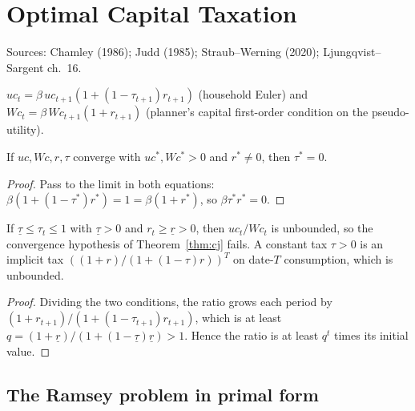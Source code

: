 \chapter{Optimal Capital Taxation}
\label{chap:fiscal}

Sources: Chamley (1986); Judd (1985); Straub--Werning (2020); Ljungqvist--Sargent ch.~16.

\begin{definition}
\label{def:cj_foc}
\leanok
$uc_t = \beta\,uc_{t+1}(1 + (1-\tau_{t+1})r_{t+1})$ (household Euler) and $Wc_t = \beta\,Wc_{t+1}(1+r_{t+1})$
(planner's capital first-order condition on the pseudo-utility).
\end{definition}

\begin{theorem}
\label{thm:cj}
\leanok
{}
If $uc, Wc, r, \tau$ converge with $uc^*, Wc^* > 0$ and $r^* \ne 0$, then $\tau^* = 0$.
\end{theorem}
\begin{proof}
\leanok
Pass to the limit in both equations: $\beta(1+(1-\tau^*)r^*) = 1 = \beta(1+r^*)$, so $\beta\tau^*r^* = 0$.
\end{proof}

\begin{theorem}
\label{thm:sw}
\leanok
{}
If $\underline\tau \le \tau_t \le 1$ with $\underline\tau>0$ and $r_t \ge \underline r > 0$, then $uc_t/Wc_t$ is
unbounded, so the convergence hypothesis of Theorem~\ref{thm:cj} fails. A constant tax $\tau>0$ is an implicit tax
$((1+r)/(1+(1-\tau)r))^T$ on date-$T$ consumption, which is unbounded.
\end{theorem}
\begin{proof}
\leanok
Dividing the two conditions, the ratio grows each period by $(1+r_{t+1})/(1+(1-\tau_{t+1})r_{t+1})$, which is at least
$q = (1+\underline r)/(1+(1-\underline\tau)\underline r) > 1$. Hence the ratio is at least $q^t$ times its initial
value.
\end{proof}

\section{The Ramsey problem in primal form}

